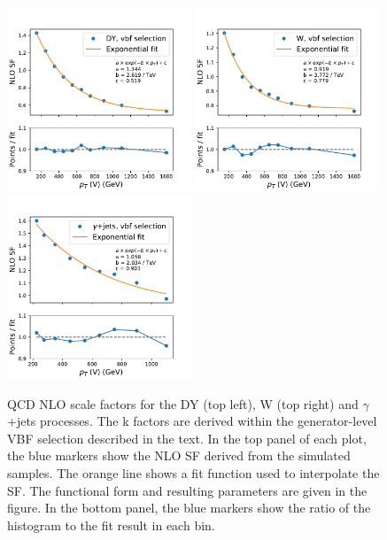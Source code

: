 \begin{figure}[ht!]
    \begin{center}
        \includegraphics[width=0.49\textwidth]{fig/theory/interpolation_vbf_dy.pdf}
        \includegraphics[width=0.49\textwidth]{fig/theory/interpolation_vbf_wjet.pdf} \\
        \includegraphics[width=0.49\textwidth]{fig/theory/interpolation_vbf_gjets.pdf}
        \caption{
            QCD NLO scale factors for the DY (top left), W (top right) and $\gamma$+jets processes.
            The k factors are derived within the generator-level VBF selection described in the text.
            In the top panel of each plot, the blue markers show the NLO SF derived from the simulated samples. The orange line shows a fit function used
            to interpolate the SF. The functional form and resulting parameters are given in the figure. In the bottom panel, the blue markers
            show the ratio of the histogram to the fit result in each bin.
          }
      \label{fig:theory_sf_qcd_nlo}
    \end{center}
  \end{figure}

